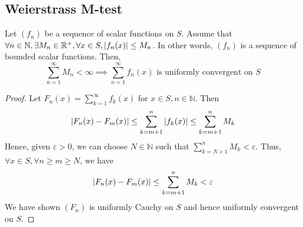 \subsection{Weierstrass M-test}
\begin{theorem}
	Let \( (f_n) \) be a sequence of scalar functions on \( S \).
	Assume that \( \forall n \in \mathbb N, \exists M_n \in \mathbb R^+, \forall x \in S, \abs{f_n(x)} \leq M_n \).
	In other words, \( (f_n) \) is a sequence of bounded scalar functions.
	Then,
	\[
		\sum_{n = 1}^\infty M_n < \infty \implies \sum_{n=1}^\infty f_n(x) \text{ is uniformly convergent on } S
	\]
\end{theorem}
\begin{proof}
	Let \( F_n(x) = \sum_{k=1}^\infty f_k(x) \) for \( x \in S, n \in \mathbb N \).
	Then
	\[
		\abs{F_n(x) - F_m(x)} \leq \sum_{k=m+1}^n \abs{f_k(x)} \leq \sum_{k=m+1}^n M_k
	\]
	Hence, given \( \varepsilon > 0 \), we can choose \( N \in \mathbb N \) such that \( \sum_{k=N+1}^n M_k < \varepsilon \).
	Thus, \( \forall x \in S, \forall n \geq m \geq N \), we have
	\[
		\abs{F_n(x) - F_m(x)} \leq \sum_{k=m+1}^n M_k < \varepsilon
	\]
	We have shown \( (F_n) \) is uniformly Cauchy on \( S \) and hence uniformly convergent on \( S \).
\end{proof}

